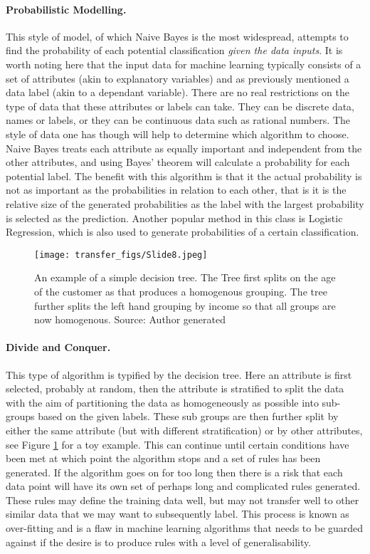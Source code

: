 \paragraph{Probabilistic Modelling.} This style of model, of which Naive Bayes is the most widespread, attempts to find the probability of each potential classification \emph{given the data inputs}. It is worth noting here that the input data for machine learning typically consists of a set of attributes (akin to explanatory variables)  and as previously mentioned a data label (akin to a dependant variable). There are no real restrictions on the type of data that these attributes or labels can take. They can be discrete data, names or labels, or they can be continuous data such as rational numbers. The style of data one has though will help to determine which algorithm to choose.  Naive Bayes treats each attribute as equally important and independent from the other attributes, and using Bayes' theorem will calculate a probability for each potential label. The benefit with this algorithm is that it the actual probability is not as important as the probabilities in relation to each other, that is it is the relative size of the generated probabilities as the label with the largest probability is selected as the prediction. Another popular method in this class is Logistic Regression, which is also used to generate probabilities of a certain classification. 

\begin{figure}
  \texttt{[image: transfer\_figs/Slide8.jpeg]}
  \caption[Decision tree example.]{An example of a simple decision tree. The Tree first splits on the age of the customer as that produces a homogenous grouping. The tree further splits the left hand grouping by income so that all groups are now homogenous. Source: Author generated }
  \label{fig:tree}
\end{figure}

\paragraph{Divide and Conquer.} This type of algorithm is typified by the decision tree. Here an attribute is first selected, probably at random, then the attribute is stratified to split the data with the aim of partitioning the data as homogeneously as possible into sub-groups based on the given labels. These sub groups are then further split by either the same attribute (but with different stratification) or by other attributes, see Figure \ref{fig:tree} for a toy example. This can continue until certain conditions have been met at which point the algorithm stops and a set of rules has been generated. If the algorithm goes on for too long then there is a risk that each data point will have its own set of perhaps long and complicated rules generated. These rules may define the training data well, but may not transfer well to other similar data that we may want to subsequently label. This process is known as over-fitting and is a flaw in machine learning algorithms that needs to be guarded against if the desire is to produce rules with a level of generalisability. 


